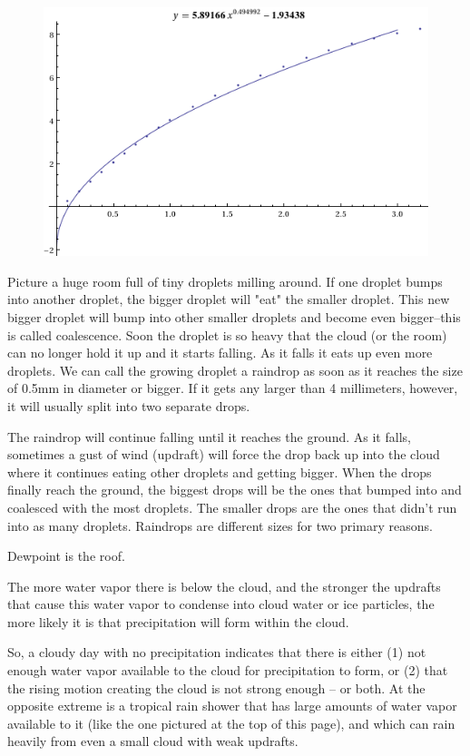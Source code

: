 \documentclass[twocolumn,a4paper,10pt]{article}
\begin{document}
\begin{figure}[t]
    \centering
    \includegraphics[width=0.75\linewidth]{terminal_velocity}
    \caption{}
    \label{fig:velocity}
\end{figure}




Picture a huge room full of tiny droplets milling around. If one droplet bumps
into another droplet, the bigger droplet will "eat" the smaller droplet. This
new bigger droplet will bump into other smaller droplets and become even
bigger--this is called coalescence. Soon the droplet is so heavy that the cloud
(or the room) can no longer hold it up and it starts falling. As it falls it
eats up even more droplets. We can call the growing droplet a raindrop as soon
as it reaches the size of 0.5mm in diameter or bigger. If it gets any larger
than 4 millimeters, however, it will usually split into two separate drops.

The raindrop will continue falling until it reaches the ground. As it falls,
sometimes a gust of wind (updraft) will force the drop back up into the cloud
where it continues eating other droplets and getting bigger. When the drops
finally reach the ground, the biggest drops will be the ones that bumped into
and coalesced with the most droplets. The smaller drops are the ones that didn't
run into as many droplets. Raindrops are different sizes for two primary
reasons.


Dewpoint is the roof.


The more water vapor there is below the cloud, and the stronger the updrafts
that cause this water vapor to condense into cloud water or ice particles, the
more likely it is that precipitation will form within the cloud. 

So, a cloudy day with no precipitation indicates that there is either (1) not
enough water vapor available to the cloud for precipitation to form, or (2) that
the rising motion creating the cloud is not strong enough -- or both.     At the
opposite extreme is a tropical rain shower that has large amounts of water vapor
available to it (like the one pictured at the top of this page), and which can
rain heavily from even a small cloud with weak updrafts. 
\end{document}
